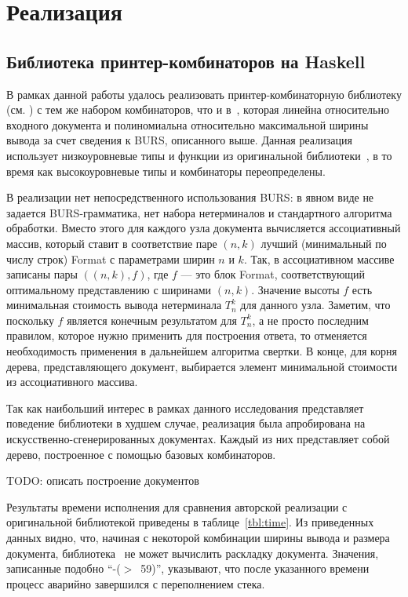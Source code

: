 \section{Реализация}



\newpage
\subsection{Библиотека принтер-комбинаторов на Haskell}

В рамках данной работы удалось реализовать
принтер-комбинаторную библиотеку (см. \cite{haskellImpl}) с тем же набором комбинаторов,
что и в~\cite{swierstra},
которая линейна относительно входного документа и полиномиальна
относительно максимальной ширины вывода за счет сведения к BURS, описанного выше.
Данная реализация использует низкоуровневые типы и функции из оригинальной
библиотеки~\cite{swierstra}, в то время как высокоуровневые типы и комбинаторы переопределены.

В реализации нет непосредственного использования BURS: в явном виде не задается BURS-грамматика,
нет набора нетерминалов и стандартного алгоритма обработки.
Вместо этого для каждого узла документа вычисляется ассоциативный массив, который
ставит в соответствие паре $(n, k)$ лучший (минимальный по числу строк) Format с параметрами
ширин $n$ и $k$. Так, в ассоциативном массиве записаны пары $((n, k), f)$, где $f$ --- это
блок Format, соответствующий оптимальному представлению с ширинами $(n, k)$. Значение
высоты $f$ есть минимальная стоимость вывода нетерминала $T^k_n$ для данного узла.
Заметим, что поскольку $f$ является конечным результатом для $T^k_n$, а не просто
последним правилом, которое нужно применить для построения ответа, то отменяется
необходимость применения в дальнейшем алгоритма свертки.
В конце, для корня дерева, представляющего документ, выбирается элемент минимальной стоимости из
ассоциативного массива.

Так как наибольший интерес в рамках данного исследования представляет поведение библиотеки
в худшем случае, реализация была апробирована на искусственно-сгенерированных документах.
Каждый из них представляет собой дерево, построенное с помощью базовых комбинаторов.

TODO: описать построение документов

Результаты времени исполнения для сравнения авторской реализации с оригинальной библиотекой
приведены в таблице~\ref{tbl:time}.
Из приведенных данных видно, что, начиная с некоторой комбинации ширины вывода и размера документа,
библиотека~\cite{swierstra} не может вычислить раскладку документа.
Значения, записанные подобно \mbox{``-($>$ 59)''},
указывают, что после указанного времени процесс аварийно завершился с переполнением стека.

